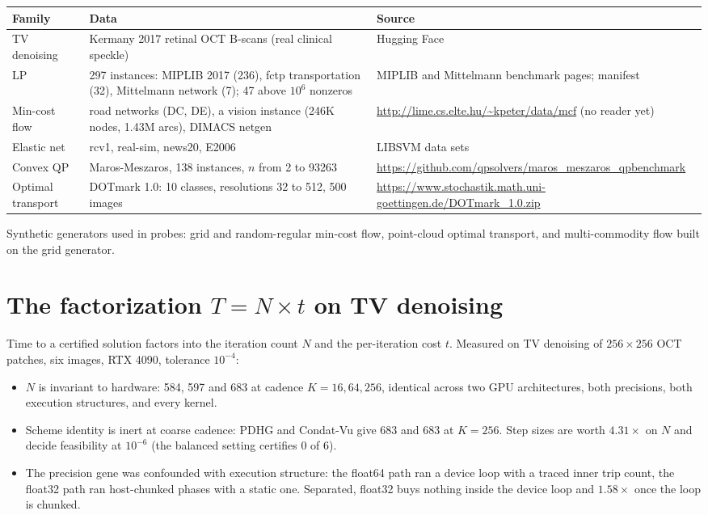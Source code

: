 \documentclass[11pt]{article}
\begin{document}
\begin{center}
\small
\begin{tabular}{p{2.3cm}p{4.6cm}p{5.6cm}}
\toprule
Family & Data & Source \\
\midrule
TV denoising & Kermany 2017 retinal OCT B-scans (real clinical speckle) &
 Hugging Face \\
LP & 297 instances: MIPLIB 2017 (236), fctp transportation (32), Mittelmann
 network (7); 47 above $10^6$ nonzeros & MIPLIB and Mittelmann benchmark
 pages; manifest \\
Min-cost flow & road networks (DC, DE), a vision instance (246K nodes, 1.43M
 arcs), DIMACS netgen & \url{http://lime.cs.elte.hu/~kpeter/data/mcf}
 (no reader yet) \\
Elastic net & rcv1, real-sim, news20, E2006 & LIBSVM data sets \\
Convex QP & Maros-Meszaros, 138 instances, $n$ from 2 to 93263 &
 \url{https://github.com/qpsolvers/maros_meszaros_qpbenchmark} \\
Optimal transport & DOTmark 1.0: 10 classes, resolutions 32 to 512, 500
 images & \url{https://www.stochastik.math.uni-goettingen.de/DOTmark_1.0.zip} \\
\bottomrule
\end{tabular}
\end{center}

Synthetic generators used in probes: grid and random-regular min-cost flow,
point-cloud optimal transport, and multi-commodity flow built on the grid
generator.

\section{The factorization $T = N \times t$ on TV denoising}
\label{app:log:factorisation}

Time to a certified solution factors into the iteration count $N$ and the
per-iteration cost $t$. Measured on TV denoising of $256\times256$ OCT
patches, six images, RTX 4090, tolerance $10^{-4}$:

\begin{itemize}
\item $N$ is invariant to hardware: 584, 597 and 683 at cadence $K=16, 64,
 256$, identical across two GPU architectures, both precisions, both
 execution structures, and every kernel.
\item Scheme identity is inert at coarse cadence: PDHG and Condat-Vu give 683
 and 683 at $K=256$. Step sizes are worth $4.31\times$ on $N$ and decide
 feasibility at $10^{-6}$ (the balanced setting certifies 0 of 6).
\item The precision gene was confounded with execution structure: the
 float64 path ran a device loop with a traced inner trip count, the float32
 path ran host-chunked phases with a static one. Separated, float32 buys
 nothing inside the device loop and $1.58\times$ once the loop is chunked.
\end{itemize}
\end{document}
